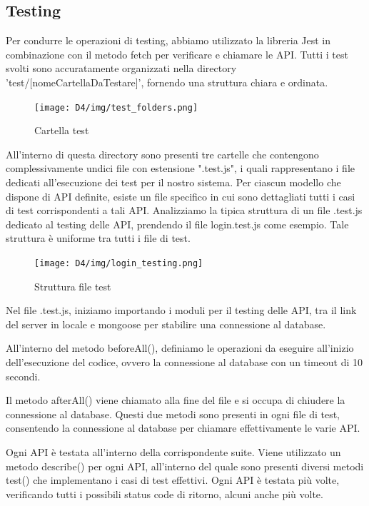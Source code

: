 \documentclass[a4paper,12pt]{article}
\begin{document}
\subsection{Testing}
Per condurre le operazioni di testing, abbiamo utilizzato la libreria Jest in combinazione con il metodo fetch per verificare e chiamare le API. Tutti i test svolti sono accuratamente organizzati nella directory 'test/[nomeCartellaDaTestare]', fornendo una struttura chiara e ordinata. 
\begin{figure}[H]
    \centering
    \texttt{[image: D4/img/test\_folders.png]}
    \caption{Cartella test}
\end{figure}
All'interno di questa directory sono presenti tre cartelle che contengono complessivamente undici file con estensione ".test.js", i quali rappresentano i file dedicati all'esecuzione dei test per il nostro sistema. Per ciascun modello che dispone di API definite, esiste un file specifico in cui sono dettagliati tutti i casi di test corrispondenti a tali API.
\newline
\newline
Analizziamo la tipica struttura di un file .test.js dedicato al testing delle API, prendendo il file login.test.js come esempio. Tale struttura è uniforme tra tutti i file di test.
\begin{figure}[H]
    \centering
    \texttt{[image: D4/img/login\_testing.png]}
    \caption{Struttura file test}
\end{figure}
Nel file .test.js, iniziamo importando i moduli per il testing delle API, tra il link del server in locale e mongoose per stabilire una connessione al database.

All'interno del metodo beforeAll(), definiamo le operazioni da eseguire all'inizio dell'esecuzione del codice, ovvero la connessione al database con un timeout di 10 secondi.

Il metodo afterAll() viene chiamato alla fine del file e si occupa di chiudere la connessione al database. 
Questi due metodi sono presenti in ogni file di test, consentendo la connessione al database per chiamare effettivamente le varie API.

Ogni API è testata all'interno della corrispondente suite. Viene utilizzato un metodo describe() per ogni API, all'interno del quale sono presenti diversi metodi test() che implementano i casi di test effettivi. Ogni API è testata più volte, verificando tutti i possibili status code di ritorno, alcuni anche più volte.
\end{document}
